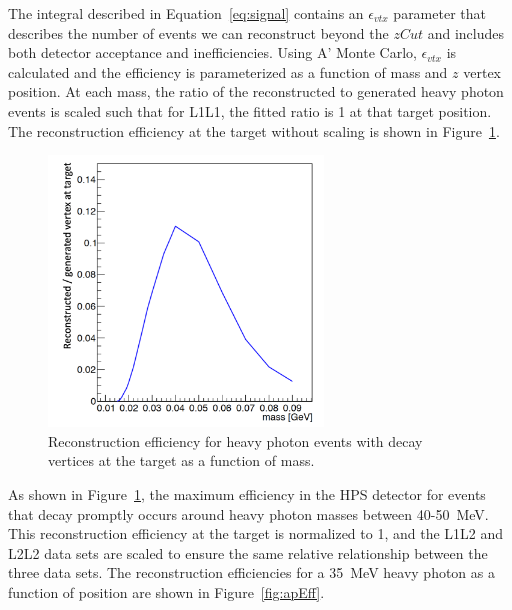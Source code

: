 The integral described in Equation~\eqref{eq:signal} contains an $\epsilon_{vtx}$ parameter that describes the number of events we can reconstruct beyond the $zCut$ and includes both detector acceptance and inefficiencies. Using A' Monte Carlo, $\epsilon_{vtx}$ is calculated and the efficiency is parameterized as a function of mass and $z$ vertex position. At each mass, the ratio of the reconstructed to generated heavy photon events is scaled such that for L1L1, the fitted ratio is 1 at that target position. The reconstruction efficiency at the target without scaling is shown in Figure~\ref{fig:rawEff}.

\begin{figure}[htb]
  \centering
      \includegraphics[width=0.65\textwidth]{pics/searching/rawEffL1L1.png}
  \caption[Reconstruction efficiency for heavy photons that decay at the target]{Reconstruction efficiency for heavy photon events with decay vertices at the target as a function of mass.}
  \label{fig:rawEff}
\end{figure} 

As shown in Figure~\ref{fig:rawEff}, the maximum efficiency in the HPS detector for events that decay promptly occurs around heavy photon masses between 40-50~MeV. This reconstruction efficiency at the target is normalized to 1, and the L1L2 and L2L2 data sets are scaled to ensure the same relative relationship between the three data sets. The reconstruction efficiencies for a 35~MeV heavy photon as a function of position are shown in Figure~\ref{fig:apEff}. 

